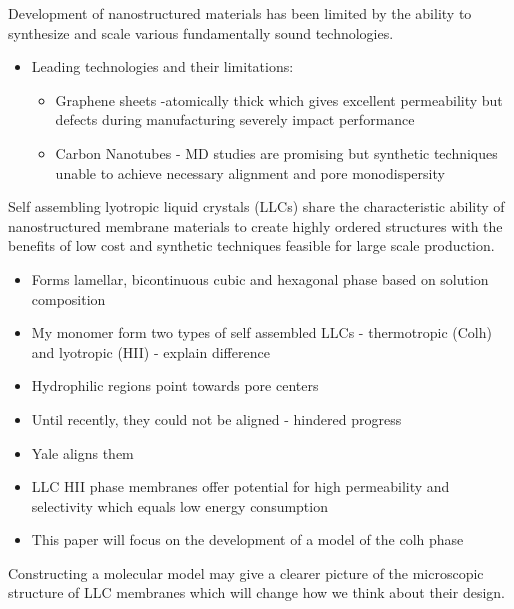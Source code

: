 \documentclass{article}
\begin{document}
	Development of nanostructured materials has been limited by the ability to synthesize and scale various fundamentally sound technologies.
	\begin{itemize}
		\item Leading technologies and their limitations:
		\begin{itemize}
			\item Graphene sheets -atomically thick which gives excellent permeability but defects during manufacturing severely impact performance
			\item Carbon Nanotubes - MD studies are promising but synthetic techniques unable to achieve necessary alignment and pore monodispersity
		\end{itemize}
	\end{itemize} 
	Self assembling lyotropic liquid crystals (LLCs) share the characteristic ability of nanostructured membrane materials to create highly ordered structures with the benefits of low cost and synthetic techniques feasible for large scale production.
	\begin{itemize}
		\item Forms lamellar, bicontinuous cubic and hexagonal phase based on solution composition
		\item My monomer form two types of self assembled LLCs - thermotropic (Colh) and lyotropic (HII) - explain difference 
		\item Hydrophilic regions point towards pore centers
		\item Until recently, they could not be aligned - hindered progress
		\item Yale aligns them
		\item LLC HII phase membranes offer potential for high permeability and selectivity which equals low energy consumption
		\item This paper will focus on the development of a model of the colh phase
	\end{itemize}
	Constructing a molecular model may give a clearer picture of the microscopic structure of LLC membranes which will change how we think about their design.
\end{document}
